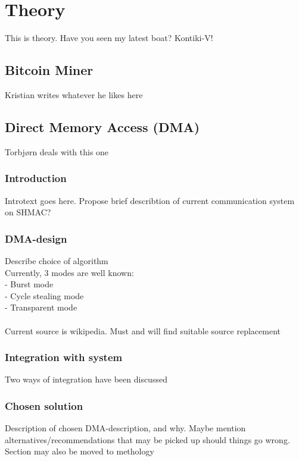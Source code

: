 \chapter{Theory}
This is theory.
Have you seen my latest boat?
Kontiki-V!

\section{Bitcoin Miner}

Kristian writes whatever he likes here

\section{Direct Memory Access (DMA)}

Torbjørn deals with this one

\subsection{Introduction}

Introtext goes here.
Propose brief describtion of current communication system on SHMAC?

\subsection{DMA-design}
Describe choice of algorithm
\\ Currently, 3 modes are well known:
\\ - Burst mode
\\ - Cycle stealing mode
\\ - Transparent mode
\\
\\ Current source is wikipedia. Must and will find suitable source replacement

\subsection{Integration with system}

Two ways of integration have been discussed 

\subsection{Chosen solution}

Description of chosen DMA-description, and why.
Maybe mention alternatives/recommendations that may be picked up should things go wrong.
\\
Section may also be moved to methology